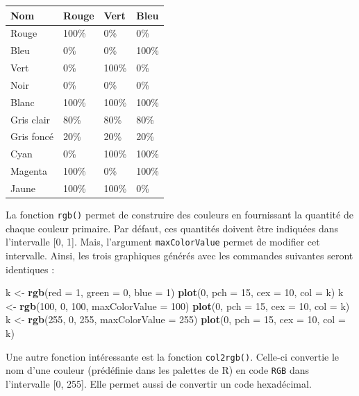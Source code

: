 \documentclass[]{article}
\newenvironment{Shaded}{\begin{snugshade}}{\end{snugshade}}
\newcommand{\DataTypeTok}[1]{\textcolor[rgb]{0.13,0.29,0.53}{#1}}
\newcommand{\DecValTok}[1]{\textcolor[rgb]{0.00,0.00,0.81}{#1}}
\newcommand{\KeywordTok}[1]{\textcolor[rgb]{0.13,0.29,0.53}{\textbf{#1}}}
\newcommand{\NormalTok}[1]{#1}
\newcommand{\StringTok}[1]{\textcolor[rgb]{0.31,0.60,0.02}{#1}}
\begin{document}
\begin{longtable}[]{@{}llll@{}}
\toprule
\textbf{Nom} & \textbf{Rouge} & \textbf{Vert} & \textbf{Bleu}\tabularnewline
\midrule
\endhead
Rouge & 100\% & 0\% & 0\%\tabularnewline
Bleu & 0\% & 0\% & 100\%\tabularnewline
Vert & 0\% & 100\% & 0\%\tabularnewline
Noir & 0\% & 0\% & 0\%\tabularnewline
Blanc & 100\% & 100\% & 100\%\tabularnewline
Gris clair & 80\% & 80\% & 80\%\tabularnewline
Gris foncé & 20\% & 20\% & 20\%\tabularnewline
Cyan & 0\% & 100\% & 100\%\tabularnewline
Magenta & 100\% & 0\% & 100\%\tabularnewline
Jaune & 100\% & 100\% & 0\%\tabularnewline
\bottomrule
\end{longtable}

La fonction \texttt{rgb()} permet de construire des couleurs en fournissant la quantité de chaque couleur primaire. Par défaut, ces quantités doivent être indiquées dans l'intervalle {[}0, 1{]}. Mais, l'argument \texttt{maxColorValue} permet de modifier cet intervalle. Ainsi, les trois graphiques générés avec les commandes suivantes seront identiques :

\begin{Shaded}
\begin{Highlighting}[]
\NormalTok{k <-}\StringTok{ }\KeywordTok{rgb}\NormalTok{(}\DataTypeTok{red =} \DecValTok{1}\NormalTok{, }\DataTypeTok{green =} \DecValTok{0}\NormalTok{, }\DataTypeTok{blue =} \DecValTok{1}\NormalTok{)}
\KeywordTok{plot}\NormalTok{(}\DecValTok{0}\NormalTok{, }\DataTypeTok{pch =} \DecValTok{15}\NormalTok{, }\DataTypeTok{cex =} \DecValTok{10}\NormalTok{, }\DataTypeTok{col =}\NormalTok{ k)}
\NormalTok{k <-}\StringTok{ }\KeywordTok{rgb}\NormalTok{(}\DecValTok{100}\NormalTok{, }\DecValTok{0}\NormalTok{, }\DecValTok{100}\NormalTok{, }\DataTypeTok{maxColorValue =} \DecValTok{100}\NormalTok{)}
\KeywordTok{plot}\NormalTok{(}\DecValTok{0}\NormalTok{, }\DataTypeTok{pch =} \DecValTok{15}\NormalTok{, }\DataTypeTok{cex =} \DecValTok{10}\NormalTok{, }\DataTypeTok{col =}\NormalTok{ k)}
\NormalTok{k <-}\StringTok{ }\KeywordTok{rgb}\NormalTok{(}\DecValTok{255}\NormalTok{, }\DecValTok{0}\NormalTok{, }\DecValTok{255}\NormalTok{, }\DataTypeTok{maxColorValue =} \DecValTok{255}\NormalTok{)}
\KeywordTok{plot}\NormalTok{(}\DecValTok{0}\NormalTok{, }\DataTypeTok{pch =} \DecValTok{15}\NormalTok{, }\DataTypeTok{cex =} \DecValTok{10}\NormalTok{, }\DataTypeTok{col =}\NormalTok{ k)}
\end{Highlighting}
\end{Shaded}

Une autre fonction intéressante est la fonction \texttt{col2rgb()}. Celle-ci convertie le nom d'une couleur (prédéfinie dans les palettes de R) en code \texttt{RGB} dans l'intervalle {[}0, 255{]}. Elle permet aussi de convertir un code hexadécimal.
\end{document}
